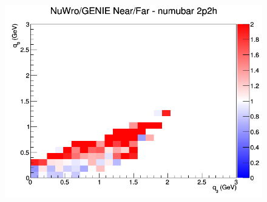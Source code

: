 \documentclass[12pt]{article}
\begin{document}
\begin{figure}[h]
\endminipage
{}
\includegraphics[width=\linewidth]{eff_q0_q3/GAr/ratios/2p2h_NuWro_GENIE_numubar_NF_q3_q0.png}
\endminipage
\newline
\end{figure}
\clearpage
\end{document}
